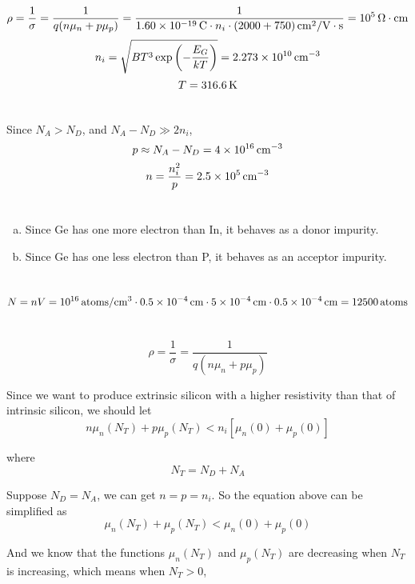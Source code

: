 \documentclass{article}
\newcommand{\Omegacm}{{\rm\,\Omega\cdot cm}}
\newcommand{\unit}[1]{{\rm\,#1}}
\begin{document}
\section{}
$$\rho=\frac{1}{\sigma}=\frac{1}{q(n\mu_n+p\mu_p)}=\frac{1}{1.60\times10^{-19}\unit{C}\cdot n_i\cdot(2000+750)\unit{cm^2/V\cdot s}}=10^5\Omegacm$$
$$n_i=\sqrt{BT^3\exp\left(-\frac{E_G}{kT}\right)}=2.273\times10^{10}\unit{cm^{-3}}$$
$$T=316.6\unit{K}$$

\section{}
Since $N_A>N_D$, and $N_A-N_D\gg 2n_i$,
$$p\approx N_A-N_D=4\times10^{16}\unit{cm^{-3}}$$
$$n=\frac{n_i^2}{p}=2.5\times10^{5}\unit{cm^{-3}}$$

\section{}
\begin{enumerate}[(a)]
\item Since Ge has one more electron than In, it behaves as a donor impurity.
\item Since Ge has one less electron than P, it behaves as an acceptor impurity.
\end{enumerate}

\section{}
$$N=nV=10^{16}\unit{atoms/cm^{3}}\cdot0.5\times10^{-4}\unit{cm}\cdot5\times10^{-4}\unit{cm}\cdot0.5\times10^{-4}\unit{cm}=12500\unit{atoms}$$

\section{}
$$\rho=\frac{1}{\sigma}=\frac{1}{q(n\mu_n+p\mu_p)}$$

Since we want to produce extrinsic silicon with a higher resistivity than that of intrinsic silicon, we should let
$$n\mu_n(N_T)+p\mu_p(N_T)<n_i[\mu_n(0)+\mu_p(0)]$$

where $$N_T=N_D+N_A$$

Suppose $N_D=N_A$, we can get $n=p=n_i$. So the equation above can be simplified as
$$\mu_n(N_T)+\mu_p(N_T)<\mu_n(0)+\mu_p(0)$$

And we know that the functions $\mu_n(N_T)$ and $\mu_p(N_T)$ are decreasing when $N_T$ is increasing, which means when $N_T>0$,
\end{document}
